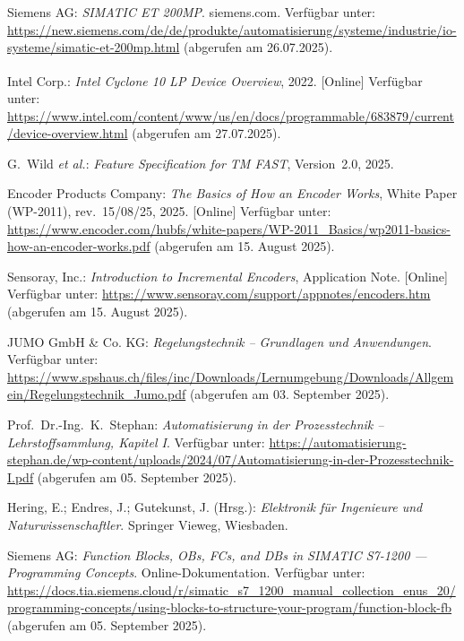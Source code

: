 \begin{thebibliography}{}
Siemens AG: \textit{SIMATIC ET 200MP}. siemens.com. Verfügbar unter: \url{https://new.siemens.com/de/de/produkte/automatisierung/systeme/industrie/io-systeme/simatic-et-200mp.html} (abgerufen am 26.07.2025).

Intel\textsuperscript{\textregistered} Corp.: \textit{Intel Cyclone 10 LP Device Overview}, 2022. [Online] Verfügbar unter: \url{https://www.intel.com/content/www/us/en/docs/programmable/683879/current/device-overview.html} (abgerufen am 27.07.2025).

G.~Wild \textit{et al.}: \textit{Feature Specification for TM FAST}, Version~2.0, 2025.

Encoder Products Company: \textit{The Basics of How an Encoder Works}, White Paper (WP-2011), rev.\ 15/08/25, 2025. [Online] Verfügbar unter: \url{https://www.encoder.com/hubfs/white-papers/WP-2011_Basics/wp2011-basics-how-an-encoder-works.pdf} (abgerufen am 15. August 2025).

Sensoray, Inc.: \textit{Introduction to Incremental Encoders}, Application Note. [Online] Verfügbar unter: \url{https://www.sensoray.com/support/appnotes/encoders.htm} (abgerufen am 15. August 2025).

JUMO GmbH \& Co. KG: \textit{Regelungstechnik – Grundlagen und Anwendungen}. Verfügbar unter: \url{https://www.spshaus.ch/files/inc/Downloads/Lernumgebung/Downloads/Allgemein/Regelungstechnik_Jumo.pdf} (abgerufen am 03. September 2025).

Prof.\ Dr.-Ing.\ K.\ Stephan: \textit{Automatisierung in der Prozesstechnik – Lehrstoffsammlung, Kapitel I}. Verfügbar unter: \url{https://automatisierung-stephan.de/wp-content/uploads/2024/07/Automatisierung-in-der-Prozesstechnik-I.pdf} (abgerufen am 05. September 2025).

Hering, E.; Endres, J.; Gutekunst, J. (Hrsg.): \textit{Elektronik für Ingenieure und Naturwissenschaftler}. Springer Vieweg, Wiesbaden.

Siemens AG: \textit{Function Blocks, OBs, FCs, and DBs in SIMATIC S7-1200 — Programming Concepts}. Online-Dokumentation. Verfügbar unter: \url{https://docs.tia.siemens.cloud/r/simatic_s7_1200_manual_collection_enus_20/programming-concepts/using-blocks-to-structure-your-program/function-block-fb} (abgerufen am 05. September 2025).


\end{thebibliography}
